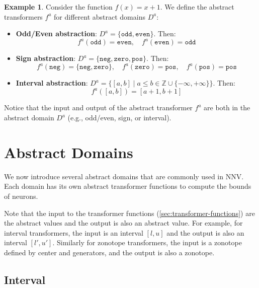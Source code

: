 \documentclass[oneside,11pt,dvipsnames]{book}
\numberwithin{equation}{section}
\theoremstyle{definition}
\newtheorem{example}{Example}[section]
\theoremstyle{remark}
\begin{document}
\begin{example}
 Consider the function $f(x) = x + 1$. We define the abstract transformers $f^a$ for different abstract domains $D^a$:

 \begin{itemize}
\item \textbf{Odd/Even abstraction}:  $D^a = \{\texttt{odd}, \texttt{even}\}$. Then:
\[
f^a(\texttt{odd}) = \texttt{even}, \quad
f^a(\texttt{even}) = \texttt{odd}
\]

\item \textbf{Sign abstraction}: $D^a = \{\texttt{neg}, \texttt{zero}, \texttt{pos}\}$. Then:
\[
f^a(\texttt{neg}) = \{\texttt{neg}, \texttt{zero}\}, \quad
f^a(\texttt{zero}) = \texttt{pos}, \quad
f^a(\texttt{pos}) = \texttt{pos}
\]


\item \textbf{Interval abstraction}: $D^a = \{ [a, b] \mid a \leq b \in \mathbb{Z} \cup \{-\infty, +\infty\} \}$. Then:
\[
f^a([a, b]) = [a+1, b+1]
\]

 \end{itemize}

 Notice that the input and output of the abstract transformer $f^a$ are both in the abstract domain $D^a$ (e.g., odd/even, sign, or interval).
\end{example}



\section{Abstract Domains}\label{sec:abstract-domains}

We now introduce several abstract domains that are commonly used in NNV. Each domain has its own abstract transformer functions  to compute the bounds of neurons.

Note that the input to the transformer functions (\autoref{sec:transformer-functions}) are the abstract values and the output is also an abstract value.  For example, for interval transformers, the input is an interval $[l, u]$ and the output is also an interval $[l', u']$. Similarly for zonotope transformers, the input is a zonotope defined by center and generators, and the output is also a zonotope.

\subsection{Interval}\label{sec:interval-abstraction}
\end{document}
